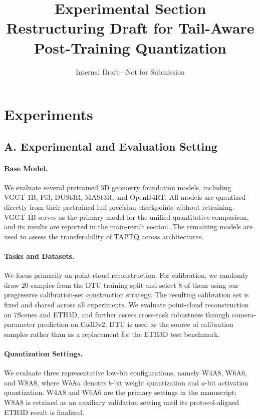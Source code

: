 \documentclass[journal]{Tail_Aware_Post_Training_Quantization_for_3D_Geometry_Models_TMM/IEEEtran}
\newcommand{\taptq}{\textsc{TAPTQ}}
\begin{document}
\title{Experimental Section Restructuring Draft for Tail-Aware Post-Training Quantization}
\author{Internal Draft---Not for Submission}
\maketitle


\section{Experiments}

\subsection{A. Experimental and Evaluation Setting}

\paragraph{Base Model.}
We evaluate several pretrained 3D geometry foundation models, including VGGT-1B, Pi3, DUSt3R, MASt3R, and OpenD4RT. All models are quantized directly from their pretrained full-precision checkpoints without retraining. VGGT-1B serves as the primary model for the unified quantitative comparison, and its results are reported in the main-result section. The remaining models are used to assess the transferability of \taptq{} across architectures.

\paragraph{Tasks and Datasets.}
We focus primarily on point-cloud reconstruction. For calibration, we randomly draw 20 samples from the DTU training split and select 8 of them using our progressive calibration-set construction strategy. The resulting calibration set is fixed and shared across all experiments. We evaluate point-cloud reconstruction on 7Scenes and ETH3D, and further assess cross-task robustness through camera-parameter prediction on Co3Dv2. DTU is used as the source of calibration samples rather than as a replacement for the ETH3D test benchmark.

\paragraph{Quantization Settings.}
We evaluate three representative low-bit configurations, namely W4A8, W6A6, and W8A8, where W$b$A$a$ denotes $b$-bit weight quantization and $a$-bit activation quantization. W4A8 and W6A6 are the primary settings in the manuscript; W8A8 is retained as an auxiliary validation setting until its protocol-aligned ETH3D result is finalized.
\end{document}
